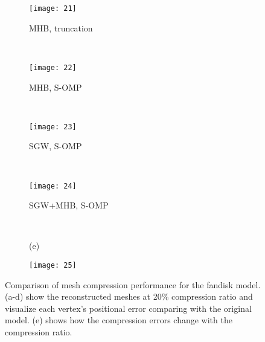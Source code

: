 \begin{figure}
    \centering
    \begin{subfigure}{0.45\linewidth}
        \texttt{[image: 21]}
        \caption{MHB, truncation}
    \end{subfigure}
    ~
    \begin{subfigure}{0.45\linewidth}
        \texttt{[image: 22]}
        \caption{MHB, S-OMP}
    \end{subfigure}
    \\
    \begin{subfigure}{0.45\linewidth}
        \texttt{[image: 23]}
        \caption{SGW, S-OMP}
    \end{subfigure}
    ~
    \begin{subfigure}{0.45\linewidth}
        \texttt{[image: 24]}
        \caption{SGW+MHB, S-OMP}
    \end{subfigure}
    \\
    \begin{subfigure}{0.05\linewidth}
        (e)
    \end{subfigure}
    \begin{subfigure}{0.83\linewidth}
        \texttt{[image: 25]}
    \end{subfigure}
    \caption[Mesh compression performance on the fandisk model.]
    {Comparison of mesh compression performance
     for the fandisk model. (a-d) show the reconstructed meshes at
     20\% compression ratio and visualize each vertex's positional
     error comparing with the original model. (e) shows how the
     compression errors change with the compression ratio.}
    \label{fig:fandiskeval}
\end{figure}

